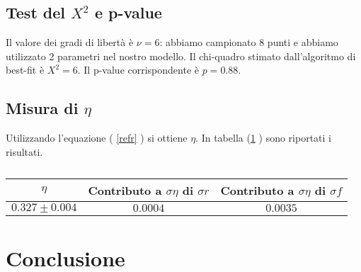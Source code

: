 \documentclass{article}
\begin{document}
\subsection{Test del $ X^2$ e p-value}
Il valore dei gradi di libertà è $\nu=6$: abbiamo campionato 8 punti e abbiamo utilizzato 2 parametri nel nostro modello. 
Il chi-quadro stimato dall'algoritmo di best-fit è $X^2=6$.
Il p-value corrispondente è $p=0.88$.


\subsection{Misura di $\eta$}
Utilizzando l'equazione  ( \ref{refr} ) si ottiene $\eta$. 
In tabella (\ref{etameas} ) sono riportati i risultati.

		\begin{table}
			\centering
				\begin{tabular}{|c|c|c|}

					\hline
						$\eta$  & Contributo a $\sigma \eta$ di $\sigma r$ & Contributo a $\sigma \eta$ di $\sigma f$\\
					\hline
			
						$0.327\pm0.004$ & $ 0.0004$ & $ 0.0035$\\
					\hline
			
				\end{tabular}
					\caption{}
					\label{etameas}
		
		\end{table}		



\section{Conclusione}
\end{document}
